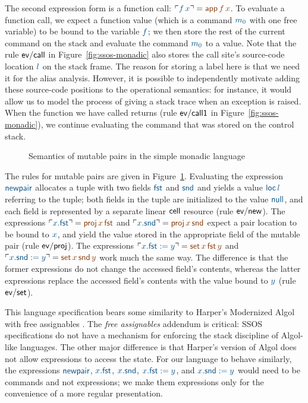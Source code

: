 The second expression form is a function call: $\interp{f\,x} = \lf{{\sf
  app}\,f\,x}$. To evaluate a function call, we expect a function value
(which is a command $\obj{m_0}$ with one free variable) to be bound to the
variable $\obj{f}$; we then store the rest of the current command on the
stack and evaluate the command $\obj{m_0}$ to a value. Note that the rule
${\sf ev/call}$ in Figure~\ref{fig:ssos-monadic} also stores the call
site's source-code location $\obj{l}$ on the stack frame. The reason for
storing a label here is that we need it for the alias
analysis. However, it is possible to independently motivate adding
these source-code positions to the operational semantics: for instance, it
would allow us to model the process of giving a stack trace when an
exception is raised. When the function we have called returns (rule
${\sf ev/call1}$ in Figure~\ref{fig:ssos-monadic}), we continue
evaluating the command that was stored on the control stack.

\begin{figure}
\caption{Semantics of mutable pairs in the simple monadic language}
\label{fig:ssos-monadic2}
\end{figure}

The rules for mutable pairs are given in
Figure~\ref{fig:ssos-monadic2}. Evaluating the expression $\obj{\sf
  newpair}$ allocates a tuple with two fields $\obj{\sf fst}$ and 
$\obj{\sf
  snd}$ and yields a value $\obj{{\sf loc}\,l}$ referring to the tuple; both
fields in the tuple are initialized to the value $\obj{\sf null}$, and
each field is represented by a separate linear ${\sf cell}$ resource
(rule ${\sf ev/new}$). The expressions $\interp{x.{\sf fst}} = \lf{{\sf
  proj}\,x\,{\sf fst}}$ and $\interp{x.{\sf snd}} = \lf{{\sf proj}\,x\,{\sf
  snd}}$ expect a pair location to be bound to $\obj{x}$, and yield the value
stored in the appropriate field of the mutable pair (rule ${\sf
  ev/proj}$). The expressions $\interp{x.{\sf fst} := y} = \lf{{\sf
  set}\,x\,{\sf fst}\,y}$ and $\interp{x.{\sf snd} := y} = \lf{{\sf
  set}\,x\,{\sf snd}\,y}$ work much the same way. The difference is
that the former expressions do not change the accessed field's
contents, whereas the latter expressions replace the accessed field's
contents with the value bound to $\obj{y}$ (rule ${\sf ev/set}$).

This language specification bears some similarity to Harper's
Modernized Algol with free assignables \cite[Chapter
36]{harper12practical}. The {\it free assignables} addendum is
critical: SSOS specifications do not have a mechanism for enforcing
the stack discipline of Algol-like languages. The other major
difference is that Harper's version of Algol does not allow
expressions to access the state.  For our language to behave
similarly, the expressions $\obj{\sf newpair}$, $\obj{x.{\sf fst}}$, 
$\obj{x.{\sf
  snd}}$, $\obj{x.{\sf fst} := y}$, and 
$\obj{x.{\sf snd} := y}$ would need to be
commands and not expressions; we make them expressions only for the
convenience of a more regular presentation.

